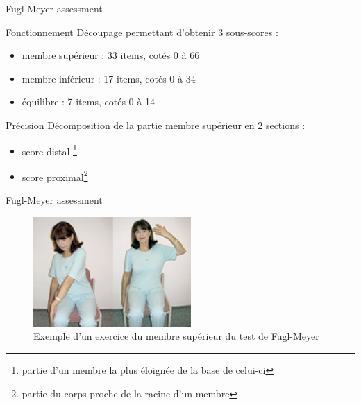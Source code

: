 \begin{frame}{Fugl-Meyer assessment}
	\begin{block}{Fonctionnement}
		Découpage permettant d'obtenir 3 sous-scores : 
		\begin{itemize}
			\item membre supérieur : 33 items, cotés 0 à 66
			\item membre inférieur : 17 items, cotés 0 à 34
			\item équilibre : 7 items, cotés 0 à 14
		\end{itemize}
	\end{block}  \pause
	\begin{block}{Précision}
		Décomposition de  la partie membre supérieur en 2 sections : 
		\begin{itemize}
			\item score distal \footnote{partie d’un membre la plus éloignée de la base de celui-ci} 
			\item score proximal\footnote{partie du corps proche de la racine d’un membre}
		\end{itemize}
	\end{block}	
\end{frame}

\begin{frame}{Fugl-Meyer assessment}
	\begin{figure}
	\centering
	\includegraphics[width=6cm]{../images/fuglmeyer_example.png}
	\caption{Exemple d’un exercice du membre supérieur du test de Fugl-Meyer}
	\end{figure}
\end{frame}

